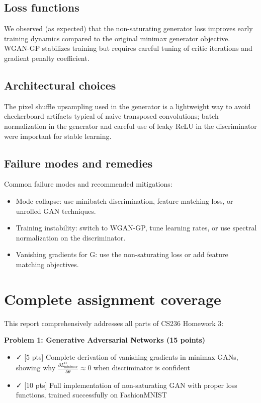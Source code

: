 \documentclass{article}
\begin{document}
\subsection{Loss functions}
We observed (as expected) that the non-saturating generator loss improves early training dynamics compared to the original minimax generator objective. WGAN-GP stabilizes training but requires careful tuning of critic iterations and gradient penalty coefficient.

\subsection{Architectural choices}
The pixel shuffle upsampling used in the generator is a lightweight way to avoid checkerboard artifacts typical of naive transposed convolutions; batch normalization in the generator and careful use of leaky ReLU in the discriminator were important for stable learning.

\subsection{Failure modes and remedies}
Common failure modes and recommended mitigations:
\begin{itemize}
  \item Mode collapse: use minibatch discrimination, feature matching loss, or unrolled GAN techniques.
  \item Training instability: switch to WGAN-GP, tune learning rates, or use spectral normalization on the discriminator.
  \item Vanishing gradients for G: use the non-saturating loss or add feature matching objectives.
\end{itemize}

\section{Complete assignment coverage}
This report comprehensively addresses all parts of CS236 Homework 3:

\textbf{Problem 1: Generative Adversarial Networks (15 points)}
\begin{itemize}
  \item ✓ [5 pts] Complete derivation of vanishing gradients in minimax GANs, showing why $\frac{\partial L_{\text{minimax}}^G}{\partial \theta} \approx 0$ when discriminator is confident
  \item ✓ [10 pts] Full implementation of non-saturating GAN with proper loss functions, trained successfully on FashionMNIST
\end{itemize}
\end{document}
